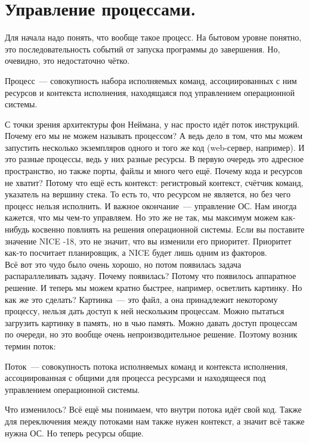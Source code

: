 \documentclass{article}
\begin{document}
    \section{Управление процессами.}
    Для начала надо понять, что вообще такое процесс. На бытовом уровне понятно, это последовательность событий от запуска программы до завершения. Но, очевидно, это недостаточно чётко.
    \begin{definition}
        Процесс~--- совокупность набора исполняемых команд, ассоциированных с ним ресурсов и контекста исполнения, находящаяся под управлением операционной системы.
    \end{definition}
    С точки зрения архитектуры фон Неймана, у нас просто идёт поток инструкций. Почему его мы не можем называть процессом? А ведь дело в том, что мы можем запустить несколько экземпляров одного и того же код (web-сервер, например). И это разные процессы, ведь у них разные ресурсы. В первую очередь это адресное пространство, но также порты, файлы и много чего ещё. Почему кода и ресурсов не хватит? Потому что ещё есть контекст: регистровый контекст, счётчик команд, указатель на вершину стека. То есть то, что ресурсом не является, но без чего процесс нельзя исполнить. И важное окончание~--- управление ОС. Нам иногда кажется, что мы чем-то управляем. Но это же не так, мы максимум можем как-нибудь косвенно повлиять на решения операционной системы. Если вы поставите значение NICE -18, это не значит, что вы изменили его приоритет. Приоритет как-то посчитает планировщик, а NICE будет лишь одним из факторов.\\
    Всё вот это чудо было очень хорошо, но потом появилась задача распараллеливать задачу. Почему появилась? Потому что появилось аппаратное решение. И теперь мы можем кратно быстрее, например, осветлить картинку. Но как же это сделать? Картинка~--- это файл, а она принадлежит некоторому процессу, нельзя дать доступ к ней нескольким процессам. Можно пытаться загрузить картинку в память, но в чью память. Можно давать доступ процессам по очереди, но это вообще очень непроизводительное решение. Поэтому возник термин поток:
    \begin{definition}
        Поток~--- совокупность потока исполняемых команд и контекста исполнения, ассоциированная с общими для процесса ресурсами и находящееся под управлением операционной системы.
    \end{definition}
    Что изменилось? Всё ещё мы понимаем, что внутри потока идёт свой код. Также для переключения между потоками нам также нужен контекст, а значит всё также нужна ОС. Но теперь ресурсы общие.\\
\end{document}
